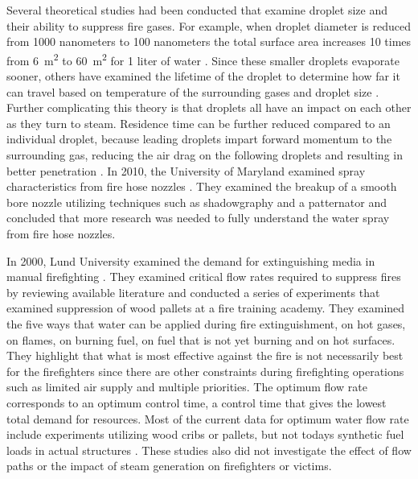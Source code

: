 \documentclass[12pt,oneside]{book}
\begin{document}
Several theoretical studies had been conducted that examine droplet size and their ability to suppress fire gases. For example, when droplet diameter is reduced from 1000 nanometers to 100 nanometers the total surface area increases 10 times from 6~m\textsuperscript{2} to 60~m\textsuperscript{2} for 1 liter of water \cite{Liu:Review_Water_Mist_Suppression}. Since these smaller droplets evaporate sooner, others have examined the lifetime of the droplet to determine how far it can travel based on temperature of the surrounding gases and droplet size \cite{Andersson:Small_Scale_Experiments}. Further complicating this theory is that droplets all have an impact on each other as they turn to steam. Residence time can be further reduced compared to an individual droplet, because leading droplets impart forward momentum to the surrounding gas, reducing the air drag on the following droplets and resulting in better penetration \cite{Hayes:Lit_Review_Dropletsize_Data}. In 2010, the University of Maryland examined spray characteristics from fire hose nozzles \cite{Salyers:Fire_Hose_Nozzle_Spray}. They examined the breakup of a smooth bore nozzle utilizing techniques such as shadowgraphy and a patternator and concluded that more research was needed to fully understand the water spray from fire hose nozzles.  

In 2000, Lund University examined the demand for extinguishing media in manual firefighting \cite{Sardqvist:Extinguishing_Media_Manual_FF}. They examined critical flow rates required to suppress fires by reviewing available literature and conducted a series of experiments that examined suppression of wood pallets at a fire training academy. They examined the five ways that water can be applied during fire extinguishment, on hot gases, on flames, on burning fuel, on fuel that is not yet burning and on hot surfaces. They highlight that what is most effective against the fire is not necessarily best for the firefighters since there are other constraints during firefighting operations such as limited air supply and multiple priorities. The optimum flow rate corresponds to an optimum control time, a control time that gives the lowest total demand for resources. Most of the current data for optimum water flow rate include experiments utilizing wood cribs or pallets, but not todays synthetic fuel loads in actual structures \cite{Kung:WoodCrib_Pallet_Fires} \cite{Bryan:Chemicals_in_Water_Fire_Extniction} \cite{Sardqvist:Firefighteing_and_Fire_Area}.  These studies also did not investigate the effect of flow paths or the impact of steam generation on firefighters or victims.
\end{document}

